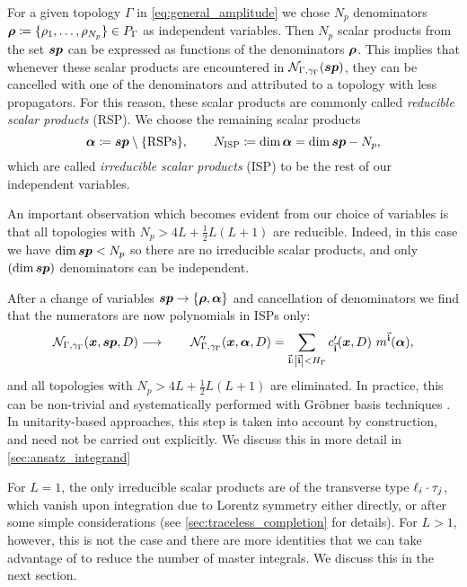 For a given topology $\Gamma$ in \cref{eq:general_amplitude} we chose $N_p$ denominators $\vb*{\rho}\coloneqq\{\rho_1,\ldots,\rho_{N_p}\} \in P_\Gamma$ as
independent variables. Then $N_p$ scalar products from the set $\vb*{sp}$
can be expressed as functions of the denominators $\vb*{\rho}$.
This implies
that whenever these scalar products are encountered in $\mathcal{N}_{\Gamma,\gamma_\Gamma}\qty(\vb*{sp})$, they can be cancelled with
one of the denominators and attributed to a topology with less propagators.
For this reason, these scalar products are commonly called \emph{reducible scalar products} (RSP).
We choose the remaining scalar products
\begin{equation}
  \vb*{\alpha} \coloneqq \vb*{sp} \setminus \{\text{RSPs}\} , \qquad N_\text{ISP} \coloneqq \dim{\vb*{\alpha}}   =  \dim{\vb*{sp}}-N_p,
\end{equation}
which are called
\emph{irreducible scalar products} (ISP) to be the rest of our independent variables.

An important observation which becomes evident from our choice of variables is that all topologies with $N_p> 4 L +\frac{1}{2}L(L+1)$ are reducible.
Indeed, in this case we have $\dim\vb*{sp} < N_p$ so there are no irreducible scalar products, and only $(\dim\vb*{sp})$ denominators can be independent.

After a change of variables $\vb*{sp}\to \{\vb*{\rho},\vb*{\alpha}\}$ and cancellation of denominators
we find that the numerators are now polynomials in ISPs only:
\begin{equation} \label{eq:rsp_reduction}
  \mathcal{N}_{\Gamma,\gamma_\Gamma}(\vb*{x}, \vb*{sp}, D) \longrightarrow \qquad
    \mathcal{N}^{\prime}_{\Gamma,\gamma_\Gamma}(\vb*{x}, \vb*{\alpha}, D) =
    \sum_{\va{i} : \abs{\va{i}} < H_{\Gamma}} c^{\prime}_{\va{i}} (\vb*{x},D)~ m^{\va{i}}(\vb*{\alpha}),
\end{equation}
and all topologies with $N_p > 4L +\frac{1}{2}L(L+1)$ are eliminated.
In practice, this can be non-trivial and systematically performed with Gröbner basis techniques \cite{Zhang:2012ce,Mastrolia:2012wf,Mastrolia:2012an,Mastrolia:2016dhn}.
In unitarity-based approaches, this step is taken into account by construction,
and need not be carried out explicitly. We discuss this in more detail in \cref{sec:ansatz_integrand}

For $L=1$, the only irreducible scalar products are of the transverse type $\sp(\ell_i, \tau_j)$, which vanish upon integration due to Lorentz symmetry either directly,
or after some simple considerations (see \cref{sec:traceless_completion} for details).
For $L>1$, however, this is not the case and there are more identities that we can take advantage of to reduce the number of master integrals.
We discuss this in the next section.

